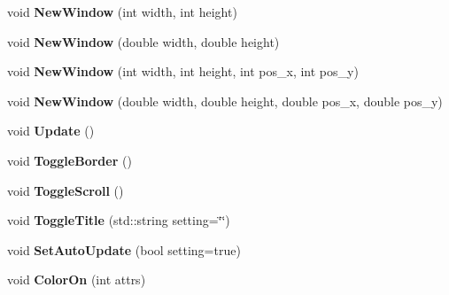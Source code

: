\begin{DoxyCompactItemize}
\mbox{\label{classostendo_1_1Window_a61cbdf968a481f95b6b806ca9332e6c4}} 
void {\bfseries New\+Window} (int width, int height)
\item 
\mbox{\label{classostendo_1_1Window_a5d79595ea48972fc2e1752890d5e815b}} 
void {\bfseries New\+Window} (double width, double height)
\item 
\mbox{\label{classostendo_1_1Window_a90b76ea8f13d3eca15a08baf0e971804}} 
void {\bfseries New\+Window} (int width, int height, int pos\+\_\+x, int pos\+\_\+y)
\item 
\mbox{\label{classostendo_1_1Window_a3cc8c66d73a4bf082332a38d1b6850bb}} 
void {\bfseries New\+Window} (double width, double height, double pos\+\_\+x, double pos\+\_\+y)
\item 
\mbox{\label{classostendo_1_1Window_a31f6220b282ed1bf705a0d95d52cd051}} 
void {\bfseries Update} ()
\item 
\mbox{\label{classostendo_1_1Window_a0f4f6327f9f42fa76c08d18d97059d7c}} 
void {\bfseries Toggle\+Border} ()
\item 
\mbox{\label{classostendo_1_1Window_ac02e38f9ad5b08a18f3bcc7b70a0944e}} 
void {\bfseries Toggle\+Scroll} ()
\item 
\mbox{\label{classostendo_1_1Window_a7772b7589637c6ddebd87697c47aefc3}} 
void {\bfseries Toggle\+Title} (std\+::string setting=\char`\"{}\char`\"{})
\item 
\mbox{\label{classostendo_1_1Window_a3d4579a58a6e14b7032390b17fca2313}} 
void {\bfseries Set\+Auto\+Update} (bool setting=true)
\item 
\mbox{\label{classostendo_1_1Window_a4944301b33c64531c83c2bba55c35bc6}} 
void {\bfseries Color\+On} (int attrs)
\item 
\mbox{\label{classostendo_1_1Window_a903272ec03cce94e8505dcd9f3317375}} 

\end{DoxyCompactItemize}
